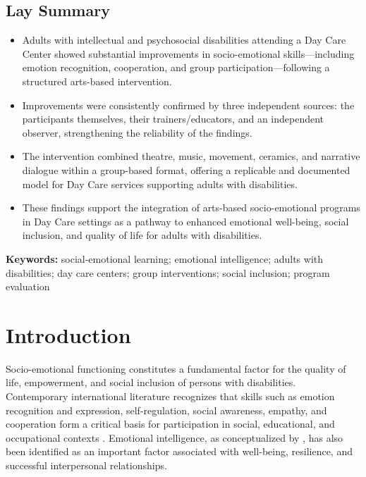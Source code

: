 \documentclass[12pt,a4paper]{article}
\begin{document}
\subsection*{Lay Summary}
\begin{itemize}
    \item Adults with intellectual and psychosocial disabilities attending a Day Care Center showed substantial improvements in socio-emotional skills---including emotion recognition, cooperation, and group participation---following a structured arts-based intervention.
    \item Improvements were consistently confirmed by three independent sources: the participants themselves, their trainers/educators, and an independent observer, strengthening the reliability of the findings.
    \item The intervention combined theatre, music, movement, ceramics, and narrative dialogue within a group-based format, offering a replicable and documented model for Day Care services supporting adults with disabilities.
    \item These findings support the integration of arts-based socio-emotional programs in Day Care settings as a pathway to enhanced emotional well-being, social inclusion, and quality of life for adults with disabilities.
\end{itemize}

\noindent\textbf{Keywords:} social-emotional learning; emotional intelligence; adults with disabilities; day care centers; group interventions; social inclusion; program evaluation

\section{Introduction}

Socio-emotional functioning constitutes a fundamental factor for the quality of life, empowerment, and social inclusion of persons with disabilities. Contemporary international literature recognizes that skills such as emotion recognition and expression, self-regulation, social awareness, empathy, and cooperation form a critical basis for participation in social, educational, and occupational contexts \citep{casel2020,weissberg2015}. Emotional intelligence, as conceptualized by \citet{goleman1995}, has also been identified as an important factor associated with well-being, resilience, and successful interpersonal relationships.
\end{document}
